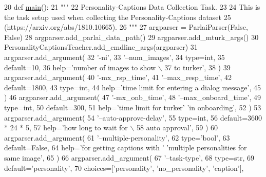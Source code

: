 \begin{DoxyCode}
20 \textcolor{keyword}{def }\hyperlink{namespaceprojects_1_1wizard__of__wikipedia_1_1mturk__evaluation__task_1_1run_ad3ab2c71f8083c3112815c0b363d316b}{main}():
21     \textcolor{stringliteral}{"""}
22 \textcolor{stringliteral}{    Personality-Captions Data Collection Task.}
23 \textcolor{stringliteral}{}
24 \textcolor{stringliteral}{    This is the task setup used when collecting the Personality-Captions dataset}
25 \textcolor{stringliteral}{    (https://arxiv.org/abs/1810.10665).}
26 \textcolor{stringliteral}{    """}
27     argparser = ParlaiParser(\textcolor{keyword}{False}, \textcolor{keyword}{False})
28     argparser.add\_parlai\_data\_path()
29     argparser.add\_mturk\_args()
30     PersonalityCaptionsTeacher.add\_cmdline\_args(argparser)
31     argparser.add\_argument(
32         \textcolor{stringliteral}{'-ni'},
33         \textcolor{stringliteral}{'--num\_images'},
34         type=int,
35         default=10,
36         help=\textcolor{stringliteral}{'number of images to show \(\backslash\)}
37 \textcolor{stringliteral}{                           to turker'},
38     )
39     argparser.add\_argument(
40         \textcolor{stringliteral}{'-mx\_rsp\_time'},
41         \textcolor{stringliteral}{'--max\_resp\_time'},
42         default=1800,
43         type=int,
44         help=\textcolor{stringliteral}{'time limit for entering a dialog message'},
45     )
46     argparser.add\_argument(
47         \textcolor{stringliteral}{'-mx\_onb\_time'},
48         \textcolor{stringliteral}{'--max\_onboard\_time'},
49         type=int,
50         default=300,
51         help=\textcolor{stringliteral}{'time limit for turker'} \textcolor{stringliteral}{'in onboarding'},
52     )
53     argparser.add\_argument(
54         \textcolor{stringliteral}{'--auto-approve-delay'},
55         type=int,
56         default=3600 * 24 * 5,
57         help=\textcolor{stringliteral}{'how long to wait for  \(\backslash\)}
58 \textcolor{stringliteral}{                           auto approval'},
59     )
60     argparser.add\_argument(
61         \textcolor{stringliteral}{'--multiple-personality'},
62         type=\textcolor{stringliteral}{'bool'},
63         default=\textcolor{keyword}{False},
64         help=\textcolor{stringliteral}{'for getting captions with '} \textcolor{stringliteral}{'multiple personalities for same image'},
65     )
66     argparser.add\_argument(
67         \textcolor{stringliteral}{'--task-type'},
68         type=str,
69         default=\textcolor{stringliteral}{'personality'},
70         choices=[\textcolor{stringliteral}{'personality'}, \textcolor{stringliteral}{'no\_personality'}, \textcolor{stringliteral}{'caption'}],

\end{DoxyCode}
